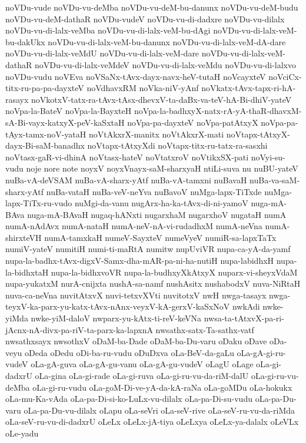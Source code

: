 {noVDu-vude
noVDu-vu-deMba
noVDu-vu-deM-bu-danunx
noVDu-vu-deM-budu
noVDu-vu-deM-dathaR
noVDu-vudeV
noVDu-vu-di-dadxre
noVDu-vu-dilalx
noVDu-vu-di-lalx-veMba
noVDu-vu-di-lalx-veM-bu-dAgi
noVDu-vu-di-lalx-veM-bu-dakUkx
noVDu-vu-di-lalx-veM-bu-danunx
noVDu-vu-di-lalx-veM-dA-dare
noVDu-vu-di-lalx-veMdU
noVDu-vu-di-lalx-veM-dare
noVDu-vu-di-lalx-veM-dathaR
noVDu-vu-di-lalx-veMdeV
noVDu-vu-di-lalx-veMdu
noVDu-vu-di-lalxvo
noVDu-vudu
noVEva
noVSaNx-tAvx-dayx-navx-heV-tutaH
noVcayxteV
noVciCx-titx-ru-pa-pa-dayxteV
noVdhavxRM
noVka-niV-yAnf
noVkatx-tAvx-tapx-ri-hA-rasayx
noVkotxV-tatx-ra-tAvx-tAsx-dhevxV-ta-daBx-va-teV-hA-Bi-dhiV-yateV
noVpa-la-BateV
noVpa-la-BayxteH
noVpa-la-badhxyX-natx-rA-yA-thaR-dhavxM-sA-Bi-vayx-katxyX-peV-kaSxtaH
noVpa-pa-dayxteV
noVpa-patAtxyX
noVpa-pa-tAyx-tamx-noV-yataH
noVtAkxrX-manitx
noVtAkxrX-mati
noVtapx-tAtxyX-dayx-Bi-saM-banadhx
noVtapx-tAtxyXdi
noVtapx-titx-ru-tatx-ra-sasxhi
noVtasx-gaR-vi-dhinA
noVtasx-hateV
noVtatxroV
noVtikxSX-pati
noVyi-su-vudu
noje
nore
note
noyxV
noyxVnayx-saM-sharxyaH
ntiLi-suva
nu
nuBU-yateV
nuBa-vA-deVSAM
nuBa-vA-sharx-yAtf
nuBa-vA-tamxni
nuBavaH
nuBa-va-saM-sharx-yAtf
nuBa-vataH
nuBa-veV-neYva
nuBavoV
nuMga-lapx-TiTxde
nuMga-lapx-TiTx-ru-vudo
nuMgi-da-vanu
nugArx-ha-ka-tAvx-di-ni-yamoV
nuga-mA-BAva
nuga-mA-BAvaH
nugaq-hANxti
nugarxhaM
nugarxhoV
nugataH
numA
numA-nAdAvx
numA-nataH
numA-neV-nA-vi-rudadhxM
numA-neVna
numA-shirxteVH
numA-tamxkaH
numeV-SayxteV
numeVyeV
numiR-sa-lapxTaTx
numiV-yateV
numitiH
numi-ti-maRtA
numitw
nupUviVR
nupa-ca-yA-da-yamf
nupa-la-badhx-tAvx-digxV-Samx-dha-mAR-pa-ni-ha-nutiH
nupa-labidhxH
nupa-la-bidhxtaH
nupa-la-bidhxvoVR
nupa-la-budhxyXkAtxyX
nuparx-vi-sheyxVdaM
nupa-yukatxM
nurA-cnijxta
nushA-sa-namf
nushAsitx
nushabodxV
nuva-NiRtaH
nuva-ca-neVna
nuvitAtxvX
nuvi-tetxvXVti
nuvitotxV
nwH
nwga-tasayx
nwga-teyxV-ka-parx-yu-katx-tAvx-nAnx-veyxV-kA-gerxV-kaSxNoV
nwkAdi
nwke-yiMda
nwke-yiM-daloV
nwparx-yu-kAtx-ti-reV-keVNa
nwsa-ta-tAtxvX-pa-ri-jAcnx-nA-divx-pa-riV-ta-parx-ka-lapxnA
nwsathx-satx-Ta-sathx-vatf
nwsathxsayx
nwsothxV
oDaM-ba-Dade
oDaM-ba-Du-varu
oDaku
oDave
oDa-veyu
oDeda
oDedu
oDi-ba-ru-vudu
oDuDxva
oLa-BeV-da-gaLu
oLa-gA-gi-ru-vudeV
oLa-gA-guva
oLa-gA-gu-vanu
oLa-gA-gu-vudeV
oLagU
oLage
oLa-gi-dadxrU
oLa-gina
oLa-gi-rade
oLa-gi-ruva
oLa-gi-ru-vu-da-riM-dalU
oLa-gi-ru-vu-deMba
oLa-gi-ru-vudu
oLa-goM-Di-ve-yA-da-kA-raNa
oLa-goMDu
oLa-hokukx
oLa-mu-Ka-vAda
oLa-pa-Di-si-ko-LuLx-vu-dilalx
oLa-pa-Di-su-vudu
oLa-pa-Du-varu
oLa-pa-Du-vu-dilalx
oLapu
oLa-seVri
oLa-seV-rive
oLa-seV-ru-vu-da-riMda
oLa-seV-ru-vu-di-dadxrU
oLeLx
oLeLx-jA-tiya
oLeLxya
oLeLx-ya-dalalx
oLeVLx
oLe-yadu
}
